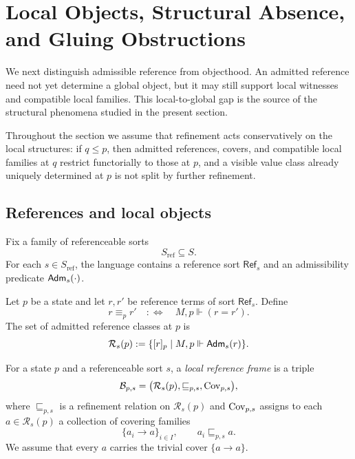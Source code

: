 \section{Local Objects, Structural Absence, and Gluing Obstructions}\label{sec:null-decomposition}

We next distinguish admissible reference from objecthood. An admitted reference need not yet determine a global object, but it may still support local witnesses and compatible local families. This local-to-global gap is the source of the structural phenomena studied in the present section.

Throughout the section we assume that refinement acts conservatively on the local structures: if $q\le p$, then admitted references, covers, and compatible local families at $q$ restrict functorially to those at $p$, and a visible value class already uniquely determined at $p$ is not split by further refinement.

\subsection{References and local objects}

Fix a family of referenceable sorts
\[
S_{\mathrm{ref}}\subseteq S.
\]
For each $s\in S_{\mathrm{ref}}$, the language contains a reference sort $\mathsf{Ref}_s$ and an admissibility predicate $\mathsf{Adm}_s(\cdot)$.

\begin{definition}\label{def:reference-classes}
Let $p$ be a state and let $r,r'$ be reference terms of sort $\mathsf{Ref}_s$. Define
\[
r\equiv_p r'
\quad:\Longleftrightarrow\quad
M,p\Vdash (r=r').
\]
The set of admitted reference classes at $p$ is
\[
\mathcal{R}_s(p):=\{[r]_p\mid M,p\Vdash \mathsf{Adm}_s(r)\}.
\]
\end{definition}

\begin{definition}\label{def:local-reference-frame}
For a state $p$ and a referenceable sort $s$, a \emph{local reference frame} is a triple
\[
\mathcal{B}_{p,s}=\bigl(\mathcal{R}_s(p),\sqsubseteq_{p,s},\mathrm{Cov}_{p,s}\bigr),
\]
where $\sqsubseteq_{p,s}$ is a refinement relation on $\mathcal{R}_s(p)$ and $\mathrm{Cov}_{p,s}$ assigns to each $a\in\mathcal{R}_s(p)$ a collection of covering families
\[
\{a_i\to a\}_{i\in I},
\qquad
a_i\sqsubseteq_{p,s} a.
\]
We assume that every $a$ carries the trivial cover $\{a\to a\}$.
\end{definition}

